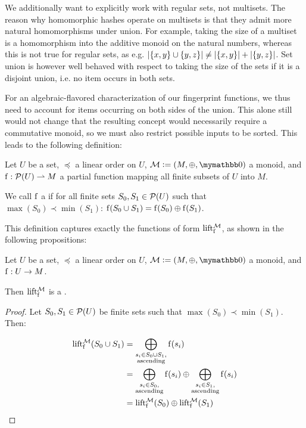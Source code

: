 We additionally want to explicitly work with regular sets, not multisets. The reason why homomorphic hashes operate on multisets is that they admit more natural homomorphisms under union. For example, taking the size of a multiset is a homomorphism into the additive monoid on the natural numbers, whereas this is not true for regular sets, as e.g. $|{\{x, y\} \cup \{y, z\}}| \neq |{\{x, y\}}| + |{\{y, z\}}|$. Set union is however well behaved with respect to taking the size of the sets if it is a disjoint union, i.e. no item occurs in both sets.

For an algebraic-flavored characterization of our fingerprint functions, we thus need to account for items occurring on both sides of the union. This alone still would not change that the resulting concept would necessarily require a commutative monoid, so we must also restrict possible inputs to be sorted. This leads to the following definition:

\begin{definition}
Let $U$ be a set, $\preceq$ a linear order on $U$, $\mathcal{M} \defeq (M, \groupaddsym, \neutraladd)$ a monoid, and ${\operatorname{f}}: {\mathcal{P}({U})} \rightharpoonup{M}$ a partial function mapping all finite subsets of $U$ into $M$.

We call $\operatorname{f}$ a  if for all finite sets $S_0, S_1 \in \mathcal{P}({U})$ such that $\max(S_0) \prec \min(S_1)$: $\operatorname{f}(S_0 \cup S_1) = {\operatorname{f}(S_0)} \oplus {\operatorname{f}(S_1)}$.
\end{definition}

This definition captures exactly the functions of form $\operatorname{lift_{\operatorname{f}}^{\mathcal{M}}}$, as shown in the following propositions:

\begin{proposition}
Let $U$ be a set, $\preceq$ a linear order on $U$, $\mathcal{M} \defeq (M, \groupaddsym, \neutraladd)$ a monoid, and ${\operatorname{f}}: {U} \rightarrow {M}$.

Then $\operatorname{lift_{\operatorname{f}}^{\mathcal{M}}}$ is a \somewhatmorphism.

\begin{proof}
Let $S_0, S_1 \in \mathcal{P}({U})$ be finite sets such that $\max(S_0) \prec \min(S_1)$. Then:

\begin{align*}
\operatorname{lift_{\operatorname{f}}^{\mathcal{M}}}(S_0 \cup S_1) &= \bigoplus_{\substack{s_i \in S_0 \cup S_1,\\ \text{ascending}}} \operatorname{f}(s_i)\\
&= \bigoplus_{\substack{s_i \in S_0,\\ \text{ascending}}} \operatorname{f}(s_i) \oplus \bigoplus_{\substack{s_i \in S_1,\\ \text{ascending}}} \operatorname{f}(s_i)\\
&= \operatorname{lift_{\operatorname{f}}^{\mathcal{M}}}(S_0) \oplus \operatorname{lift_{\operatorname{f}}^{\mathcal{M}}}(S_1)\\
\end{align*}
\end{proof}
\end{proposition}

